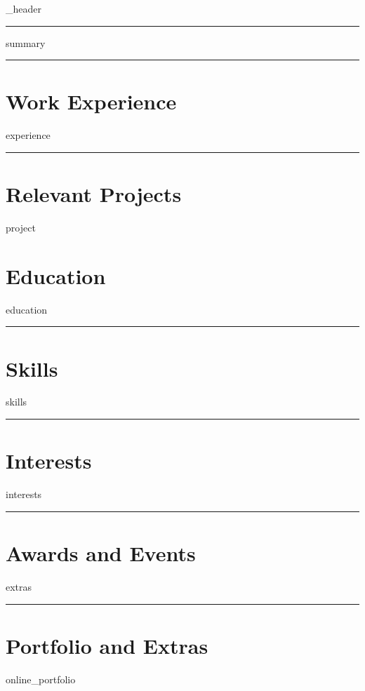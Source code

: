\documentclass[letter,10pt]{article}
\author{Guilherme Lopes}
\begin{document}
{_header}
\vspace*{10pt}
\hrule
\vspace*{6pt}

{summary}
\vspace*{6pt}
\hrule

\section{\textbf{Work Experience}}
\vspace*{3pt}
{experience}
\vspace*{6pt}
\hrule

\section{\textbf{Relevant Projects}}
\vspace*{3pt}
{project}
\vspace*{32pt}

\section{\textbf{Education}}
\vspace*{3pt}
{education}
\hrule
\vspace*{6pt}

\section{\textbf{Skills}}
\vspace*{3pt}
{skills}
\vspace*{6pt}
\hrule

\section{\textbf{Interests}}
\vspace*{3pt}
{interests}
\vspace*{6pt}
\hrule

\section{\textbf{Awards and Events}}
\vspace*{3pt}
{extras}
\vspace*{6pt}

\hrule
\section{\textbf{Portfolio and Extras}}
\vspace*{6pt}
{online_portfolio}
\end{document}
